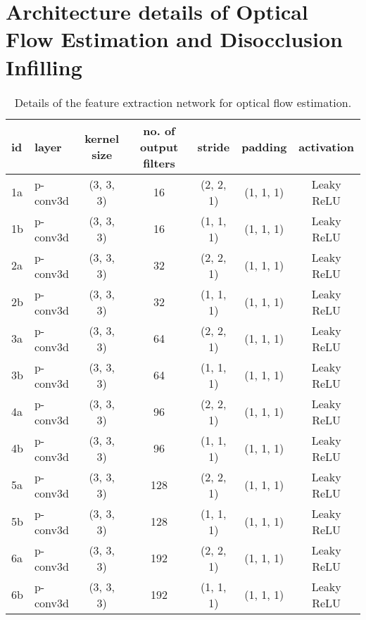 \documentclass[preprint]{vgtc}
\begin{document}
    \section{Architecture details of Optical Flow Estimation and Disocclusion Infilling}\label{sec:flow-math}
    \begin{table*}
        \centering
        \begin{tabular}{l|lccccc}
            \hline
            \textbf{id} & \textbf{layer} & \textbf{kernel size} & \textbf{no. of output filters} & \textbf{stride} & \textbf{padding} & \textbf{activation} \\
            \hline
            1a & p-conv3d & (3, 3, 3) & 16 & (2, 2, 1) & (1, 1, 1) & Leaky ReLU \\
            1b & p-conv3d & (3, 3, 3) & 16 & (1, 1, 1) & (1, 1, 1) & Leaky ReLU \\
            2a & p-conv3d & (3, 3, 3) & 32 & (2, 2, 1) & (1, 1, 1) & Leaky ReLU \\
            2b & p-conv3d & (3, 3, 3) & 32 & (1, 1, 1) & (1, 1, 1) & Leaky ReLU \\
            3a & p-conv3d & (3, 3, 3) & 64 & (2, 2, 1) & (1, 1, 1) & Leaky ReLU \\
            3b & p-conv3d & (3, 3, 3) & 64 & (1, 1, 1) & (1, 1, 1) & Leaky ReLU \\
            4a & p-conv3d & (3, 3, 3) & 96 & (2, 2, 1) & (1, 1, 1) & Leaky ReLU \\
            4b & p-conv3d & (3, 3, 3) & 96 & (1, 1, 1) & (1, 1, 1) & Leaky ReLU \\
            5a & p-conv3d & (3, 3, 3) & 128 & (2, 2, 1) & (1, 1, 1) & Leaky ReLU \\
            5b & p-conv3d & (3, 3, 3) & 128 & (1, 1, 1) & (1, 1, 1) & Leaky ReLU \\
            6a & p-conv3d & (3, 3, 3) & 192 & (2, 2, 1) & (1, 1, 1) & Leaky ReLU \\
            6b & p-conv3d & (3, 3, 3) & 192 & (1, 1, 1) & (1, 1, 1) & Leaky ReLU \\
            \hline
        \end{tabular}
        \caption{Details of the feature extraction network for optical flow estimation.}
        \label{tab:pwc-feature-extraction}
    \end{table*}
\end{document}
